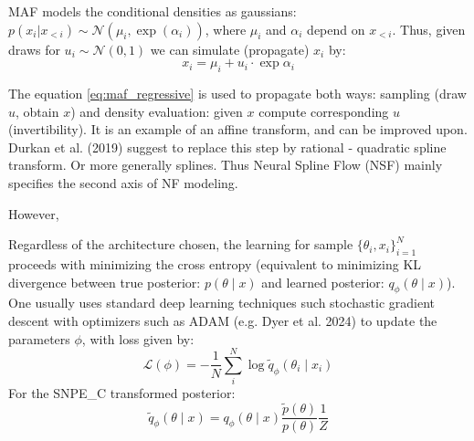 \documentclass[12pt]{article}
\begin{document}
MAF models the conditional densities as gaussians: $p(x_i | x_{<i}) \sim \mathcal{N}(\mu_i, \exp (\alpha_i))$, where $\mu_i$ and $\alpha_i$ depend on $x_{<i}$. Thus, given draws for $u_i \sim \mathcal{N}(0, 1)$ we can simulate (propagate) $x_i$ by: 
\begin{equation} \label{eq:maf_regressive}
    x_i = \mu_i + u_i \cdot \exp \alpha_i 
\end{equation}

The equation \eqref{eq:maf_regressive} is used to propagate both ways: sampling (draw $u$, obtain $x$) and density evaluation: given $x$ compute corresponding $u$ (invertibility). It is an example of an affine transform, and can be improved upon. Durkan et al. (2019) suggest to replace this step by rational - quadratic spline transform. Or more generally splines. Thus Neural Spline Flow (NSF) mainly specifies the second axis of NF modeling.

However, 

Regardless of the architecture chosen, the learning for sample $\{ \theta_i, x_i \}_{i = 1}^N$ proceeds with minimizing the cross entropy (equivalent to minimizing KL divergence between true posterior: $p(\theta \mid x)$ and learned posterior: $q_\phi(\theta \mid x)$). One usually uses standard deep learning techniques such stochastic gradient descent with optimizers such as ADAM (e.g. Dyer et al. 2024) to update the parameters $\phi$, with loss given by:
\begin{equation} \label{eq:nnl}
    \mathcal{L}(\phi) = -\frac{1}{N}\sum_i^N \log \tilde{q}_\phi(\theta_i \mid x_i)
\end{equation}
For the SNPE\_C transformed posterior:
\begin{equation} \label{eq:apt}
    \tilde{q}_\phi(\theta \mid x) = q_\phi(\theta \mid x)\frac{\tilde{p}(\theta)}{p(\theta)} \frac{1}{Z}
\end{equation}
\end{document}
